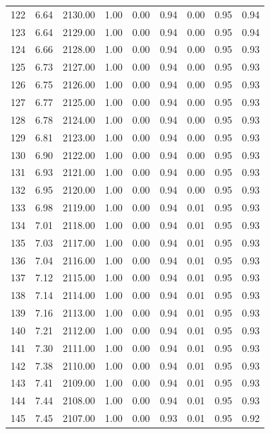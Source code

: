 \documentclass{article}\usepackage[]{graphicx}\usepackage[]{color}
\begin{document}
\begin{longtable}{rrrrrrrrr}
  122 & 6.64 & 2130.00 & 1.00 & 0.00 & 0.94 & 0.00 & 0.95 & 0.94 \\ 
  123 & 6.64 & 2129.00 & 1.00 & 0.00 & 0.94 & 0.00 & 0.95 & 0.94 \\ 
  124 & 6.66 & 2128.00 & 1.00 & 0.00 & 0.94 & 0.00 & 0.95 & 0.93 \\ 
  125 & 6.73 & 2127.00 & 1.00 & 0.00 & 0.94 & 0.00 & 0.95 & 0.93 \\ 
  126 & 6.75 & 2126.00 & 1.00 & 0.00 & 0.94 & 0.00 & 0.95 & 0.93 \\ 
  127 & 6.77 & 2125.00 & 1.00 & 0.00 & 0.94 & 0.00 & 0.95 & 0.93 \\ 
  128 & 6.78 & 2124.00 & 1.00 & 0.00 & 0.94 & 0.00 & 0.95 & 0.93 \\ 
  129 & 6.81 & 2123.00 & 1.00 & 0.00 & 0.94 & 0.00 & 0.95 & 0.93 \\ 
  130 & 6.90 & 2122.00 & 1.00 & 0.00 & 0.94 & 0.00 & 0.95 & 0.93 \\ 
  131 & 6.93 & 2121.00 & 1.00 & 0.00 & 0.94 & 0.00 & 0.95 & 0.93 \\ 
  132 & 6.95 & 2120.00 & 1.00 & 0.00 & 0.94 & 0.00 & 0.95 & 0.93 \\ 
  133 & 6.98 & 2119.00 & 1.00 & 0.00 & 0.94 & 0.01 & 0.95 & 0.93 \\ 
  134 & 7.01 & 2118.00 & 1.00 & 0.00 & 0.94 & 0.01 & 0.95 & 0.93 \\ 
  135 & 7.03 & 2117.00 & 1.00 & 0.00 & 0.94 & 0.01 & 0.95 & 0.93 \\ 
  136 & 7.04 & 2116.00 & 1.00 & 0.00 & 0.94 & 0.01 & 0.95 & 0.93 \\ 
  137 & 7.12 & 2115.00 & 1.00 & 0.00 & 0.94 & 0.01 & 0.95 & 0.93 \\ 
  138 & 7.14 & 2114.00 & 1.00 & 0.00 & 0.94 & 0.01 & 0.95 & 0.93 \\ 
  139 & 7.16 & 2113.00 & 1.00 & 0.00 & 0.94 & 0.01 & 0.95 & 0.93 \\ 
  140 & 7.21 & 2112.00 & 1.00 & 0.00 & 0.94 & 0.01 & 0.95 & 0.93 \\ 
  141 & 7.30 & 2111.00 & 1.00 & 0.00 & 0.94 & 0.01 & 0.95 & 0.93 \\ 
  142 & 7.38 & 2110.00 & 1.00 & 0.00 & 0.94 & 0.01 & 0.95 & 0.93 \\ 
  143 & 7.41 & 2109.00 & 1.00 & 0.00 & 0.94 & 0.01 & 0.95 & 0.93 \\ 
  144 & 7.44 & 2108.00 & 1.00 & 0.00 & 0.94 & 0.01 & 0.95 & 0.93 \\ 
  145 & 7.45 & 2107.00 & 1.00 & 0.00 & 0.93 & 0.01 & 0.95 & 0.92 \\ 

\end{longtable}
\end{document}
